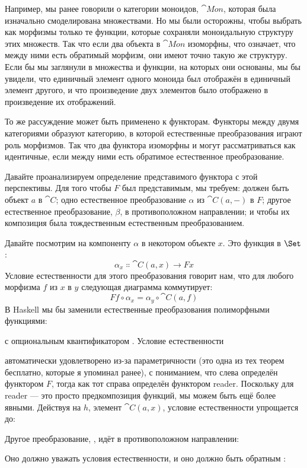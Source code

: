 Например, мы ранее говорили о категории моноидов,
$\cat{Mon}$, которая была изначально смоделирована множествами. Но мы были осторожны,
чтобы выбрать как морфизмы только те функции, которые сохраняли моноидальную
структуру этих множеств. Так что если два объекта в $\cat{Mon}$
изоморфны, что означает, что между ними есть обратимый морфизм, они
имеют точно такую же структуру. Если бы мы заглянули в множества и функции,
на которых они основаны, мы бы увидели, что единичный элемент одного моноида
был отображён в единичный элемент другого, и что произведение двух
элементов было отображено в произведение их отображений.

То же рассуждение может быть применено к функторам. Функторы между двумя
категориями образуют категорию, в которой естественные преобразования играют
роль морфизмов. Так что два функтора изоморфны и могут рассматриваться как
идентичные, если между ними есть обратимое естественное преобразование.

Давайте проанализируем определение представимого функтора с этой
перспективы. Для того чтобы $F$ был представимым, мы требуем: должен
быть объект $a$ в $\cat{C}$; одно естественное преобразование $\alpha$ из
$\cat{C}(a, -)$ в $F$; другое естественное преобразование, $\beta$, в
противоположном направлении; и чтобы их композиция была тождественным
естественным преобразованием.

Давайте посмотрим на компоненту $\alpha$ в некотором объекте $x$. Это
функция в $\Set$:
\[\alpha_x \Colon \cat{C}(a, x) \to F x\]
Условие естественности для этого преобразования говорит нам, что для любого
морфизма $f$ из $x$ в $y$ следующая диаграмма
коммутирует:
\[F f \circ \alpha_x = \alpha_y \circ \cat{C}(a, f)\]
В Haskell мы бы заменили естественные преобразования полиморфными
функциями:

с опциональным квантификатором . Условие естественности

автоматически удовлетворено из-за параметричности (это одна из тех
теорем бесплатно, которые я упоминал ранее), с пониманием, что
 слева определён функтором $F$, тогда как
тот справа определён функтором reader. Поскольку
 для reader --- это просто предкомпозиция функций, мы можем быть ещё
более явными. Действуя на $h$, элемент $\cat{C}(a, x)$,
условие естественности упрощается до:

Другое преобразование, , идёт в противоположном направлении:

Оно должно уважать условия естественности, и оно должно быть обратным :

